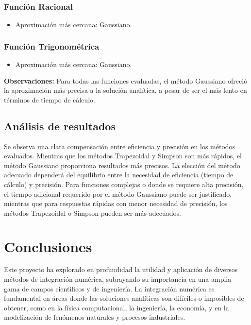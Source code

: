 \documentclass[a4paper]{article}
\begin{document}
    \subsubsection{Función Racional}
    \begin{itemize}
        \item Aproximación más cercana: Gaussiano.
    \end{itemize}
    
    \subsubsection{Función Trigonométrica}
    \begin{itemize}
        \item Aproximación más cercana: Gaussiano.
    \end{itemize}
    
    \textbf{Observaciones:}
    Para todas las funciones evaluadas, el método Gaussiano ofreció la aproximación más precisa a la solución analítica, a pesar de ser el más lento en términos de tiempo de cálculo.
    
    \subsection{Análisis de resultados}
    
    Se observa una clara compensación entre eficiencia y precisión en los métodos evaluados. Mientras que los métodos Trapezoidal y Simpson son más rápidos, el método Gaussiano proporciona resultados más precisos. La elección del método adecuado dependerá del equilibrio entre la necesidad de eficiencia (tiempo de cálculo) y precisión. Para funciones complejas o donde se requiere alta precisión, el tiempo adicional requerido por el método Gaussiano puede ser justificado, mientras que para respuestas rápidas con menor necesidad de precisión, los métodos Trapezoidal o Simpson pueden ser más adecuados.
    
     
    \section{Conclusiones}
    \label{sec:Conclusiones}
    Este proyecto ha explorado en profundidad la utilidad y aplicación de diversos métodos de integración numérica, subrayando su importancia en una amplia gama de campos científicos y de ingeniería. La integración numérica es fundamental en áreas donde las soluciones analíticas son difíciles o imposibles de obtener, como en la física computacional, la ingeniería, la economía, y en la modelización de fenómenos naturales y procesos industriales.
\end{document}
